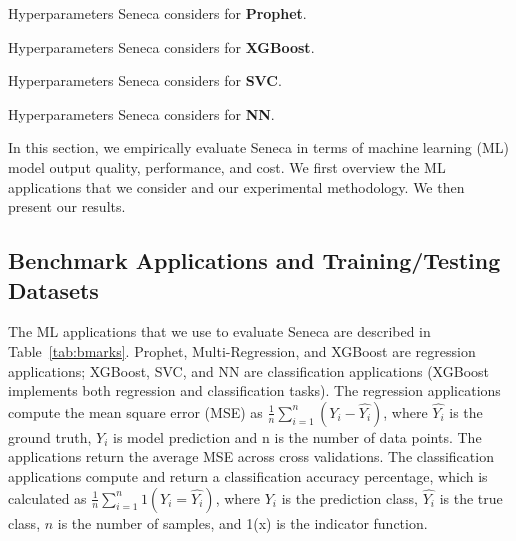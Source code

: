 
\begin{table}[t]
\centering

\caption{Machine learning applications used 
to evaluate Seneca. 
\label{tab:bmarks}}
\vspace{-0.1in}
\end{table}

\begin{table}[t]
\centering

\caption{Hyperparameters Seneca considers for \textbf{Prophet}. 
\label{tab:prophet_para}}
\end{table}

\begin{table}[t]
\centering

\caption{Hyperparameters Seneca considers for \textbf{XGBoost}. 
\label{tab:xgboost_para}}
\vspace{-0.2in}
\end{table}

\begin{table}[t]
\centering

\caption{Hyperparameters Seneca considers for \textbf{SVC}. 
\label{tab:svc_para}}
\end{table}

\begin{table}[t]
\centering

\caption{Hyperparameters Seneca considers for \textbf{NN}.
\label{tab:nn_para}}
\vspace{-0.2in}
\end{table}

In this section, we empirically evaluate Seneca in terms of machine learning (ML) 
model output quality, performance, and cost.
We first overview the ML applications 
that we consider and our experimental methodology. 
We then present our results. 

\subsection{Benchmark Applications and Training/Testing Datasets}
The ML applications that we use to evaluate Seneca 
are described in Table~\ref{tab:bmarks}.
Prophet, Multi-Regression, and XGBoost are regression
applications; 
XGBoost, SVC, and NN are classification applications (XGBoost 
implements both regression and classification tasks).
The regression applications compute the mean square error (MSE) 
as $\frac{1}{n}\sum_{i=1}^{n}(Y_i - \hat{Y_i})$, where $\hat{Y_i}$ is the ground truth, 
$Y_i$ is model prediction and n is the number of data points. The applications
return the average MSE across cross validations.
The classification applications compute and return a classification accuracy 
percentage, which is calculated
as $\frac{1}{n}\sum_{i=1}^{n}1(Y_i = \hat{Y_i})$, where $Y_i$ is the
prediction class, $\hat{Y_i}$ is the true class, $n$ is the number of samples, and 1(x) is the indicator function. 

